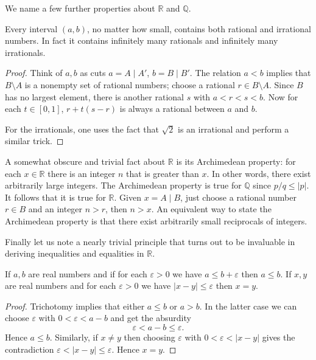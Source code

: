 We name a few further properties about $\mathbb{R}$ and $\mathbb{Q}$.

\begin{thm}
  Every interval $(a,b)$, no matter how small, contains both rational and irrational numbers.
  In fact it contains infinitely many rationals and infinitely many irrationals.
\end{thm}

\begin{proof}
  Think of $a,b$ as cuts $a = A \mid A'$, $b = B \mid B'$.  The relation $a < b$ implies that $B \setminus A$ is a nonempty set of rational numbers; choose a rational $r \in B \setminus A$.  Since $B$ has no largest element, there is another rational $s$ with $a < r < s < b$.
  Now for each $t \in [0,1]$, $r + t (s-r)$ is always a rational between $a$ and $b$.

  For the irrationals, one uses the fact that $\sqrt{2}$ is an irrational and perform a similar trick.
\end{proof}

A somewhat obscure and trivial fact about $\mathbb{R}$ is its \textsf{Archimedean property}: for each $x \in \mathbb{R}$ there is an integer $n$ that is greater than $x$.
In other words, there exist arbitrarily large integers.
The Archimedean property is true for $\mathbb{Q}$ since $p/q \leqslant |p|$.
It follows that it is true for $\mathbb{R}$.
Given $x = A \mid B$, just choose a rational number $r \in B$ and an integer $n > r$, then $n > x$.
An equivalent way to state the Archimedean property is that there exist arbitrarily small reciprocals of integers.

Finally let us note a nearly trivial principle that turns out to be invaluable in deriving inequalities and equalities in $\mathbb{R}$.

\begin{thm}
If $a, b$ are real numbers and if for each $\varepsilon > 0$ we have $a \leqslant b + \varepsilon$ then $a \leqslant b$.  If $x,y$ are real numbers and for each $\varepsilon > 0$ we have $|x-y| \leqslant \varepsilon$ then $x=y$.
\end{thm}

\begin{proof}
  Trichotomy implies that either $a \leqslant b$ or $a > b$.  In the latter case we can choose $\varepsilon$ with $0 < \varepsilon < a-b$ and get the absurdity
  \[
    \varepsilon < a - b \leqslant \varepsilon.
  \]
  Hence $a \leqslant b$.  Similarly, if $x \ne y$ then choosing $\varepsilon$ with $0 < \varepsilon < |x-y|$ gives the contradiction $\varepsilon < |x-y| \leqslant \varepsilon$.  Hence $x=y$.
\end{proof}
